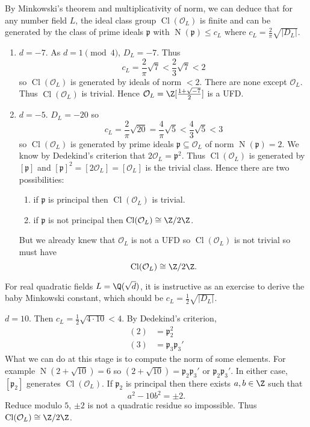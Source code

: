\documentclass[a4paper]{article}
\renewcommand*{\O}{\mathcal{O}}
\DeclareMathOperator{\n}{N}
\DeclareMathOperator{\Cl}{Cl}%
\begin{document}
By Minkowski's theorem and multiplicativity of norm, we can deduce that for any number field \(L\), the ideal class group \(\Cl(\O_L)\) is finite and can be generated by the class of prime ideals \(\mathfrak{p}\) with \(\n(\mathfrak{p}) \leq c_L\) where \(c_L = \frac{2}{\pi}\sqrt{|D_L|}\).

\begin{eg}\leavevmode
  \begin{enumerate}
  \item \(d = -7\). As \(d = 1 \pmod 4\), \(D_L = -7\). Thus
    \[
      c_L = \frac{2}{\pi} \sqrt 7 < \frac{2}{3} \sqrt 7 < 2
    \]
    so \(\Cl(\O_L)\) is generated by ideals of norm \(< 2\). There are none except \(\O_L\). Thus \(\Cl(\O_L)\) is trivial. Hence \(\O_L = \Z[\frac{1 + \sqrt{-7}}{2}]\) is a UFD.
  \item \(d = -5\). \(D_L = -20\) so
    \[
      c_L = \frac{2}{\pi}\sqrt{20} = \frac{4}{\pi}\sqrt 5 < \frac{4}{3} \sqrt 5 < 3
    \]
    so \(\Cl(\O_L)\) is generated by prime ideals \(\mathfrak p \subseteq \O_L\) of norm \(\n(\mathfrak p) = 2\). We know by Dedekind's criterion that \(2\O_L = \mathfrak p^2\). Thus \(\Cl(\O_L)\) is generated by \([\mathfrak p]\) and \([\mathfrak p]^2 = [2\O_L] = [\O_L]\) is the trivial class. Hence there are two possibilities:
    \begin{enumerate}
    \item if \(\mathfrak p\) is principal then \(\Cl(\O_L)\) is trivial.
    \item if \(\mathfrak p\) is not principal then \(\Cl(\O_L) \cong \Z/2\Z\).
    \end{enumerate}
    But we already knew that \(\O_L\) is not a UFD so \(\Cl(\O_L)\) is not trivial so must have
    \[
      \Cl(\O_L) \cong \Z/2\Z.
    \]
  \end{enumerate}
\end{eg}

For real quadratic fields \(L = \Q(\sqrt d)\), it is instructive as an exercise to derive the baby Minkowski constant, which should be \(c_L = \frac{1}{2}\sqrt{|D_L|}\).

\begin{eg}
  \(d = 10\). Then \(c_L = \frac{1}{2} \sqrt{4 \cdot 10} < 4\). By Dedekind's criterion,
  \begin{align*}
    (2) &= \mathfrak p_2^2 \\
    (3) &= \mathfrak p_3 \mathfrak p_3'
  \end{align*}
  What we can do at this stage is to compute the norm of some elements. For example \(\n(2 + \sqrt{10}) = 6\) so \((2 + \sqrt{10}) = \mathfrak p_2 \mathfrak p_3'\) or \(\mathfrak p_2 \mathfrak p_3'\). In either case, \([\mathfrak p_2]\) generates \(\Cl(\O_L)\). If \(\mathfrak p_2\) is principal then there exists \(a, b \in \Z\) such that
  \[
    a^2 - 10b^2 = \pm 2.
  \]
  Reduce modulo \(5\), \(\pm 2\) is not a quadratic residue so impossible. Thus \(\Cl(\O_L) \cong \Z/2\Z\).
\end{eg}
\end{document}
